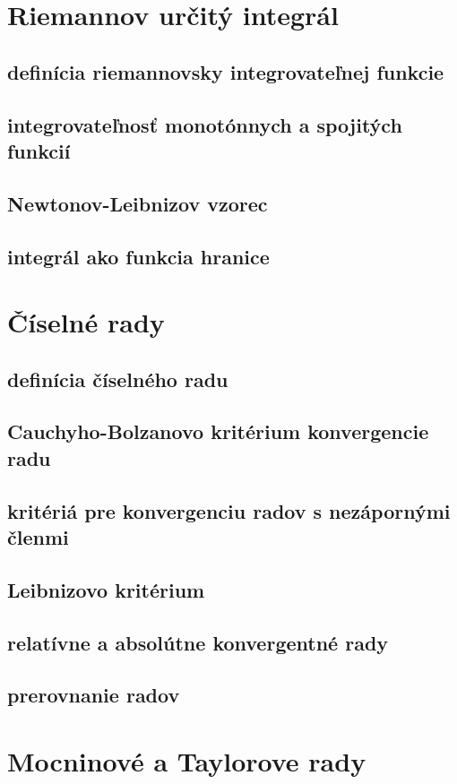 {\section{Riemannov určitý integrál}
\subsection{definícia riemannovsky integrovateľnej funkcie}
\subsection{integrovateľnosť monotónnych a spojitých funkcií}
\subsection{Newtonov-Leibnizov vzorec}
\subsection{integrál ako funkcia hranice}


\section{Číselné rady}
\subsection{definícia číselného radu}
\subsection{Cauchyho-Bolzanovo kritérium konvergencie radu}
\subsection{kritériá pre konvergenciu radov s nezápornými členmi}
\subsection{Leibnizovo kritérium}
\subsection{relatívne a absolútne konvergentné rady}
\subsection{prerovnanie radov}


\section{Mocninové a Taylorove rady}
}
